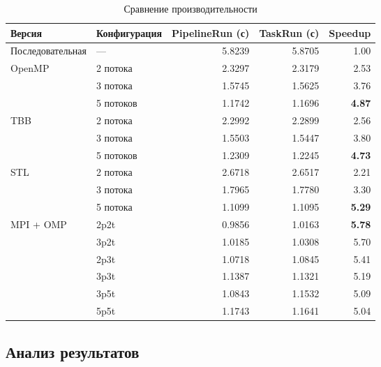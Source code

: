 \documentclass[14pt,a4paper]{extarticle}
\begin{document}
\begin{table}[H]
\centering
\footnotesize
\renewcommand{\arraystretch}{1.2}
\setlength{\tabcolsep}{4pt}
\begin{tabularx}{0.95\textwidth}{@{}l>{\raggedright}Xrrr@{}}
\toprule
\textbf{Версия} & \textbf{Конфигурация} & \textbf{PipelineRun (с)} & \textbf{TaskRun (с)} & \textbf{Speedup} \\ 
\midrule
Последовательная & — & 5.8239 & 5.8705 & 1.00 \\
\midrule

OpenMP 
  & 2 потока & 2.3297 & 2.3179 & 2.53 \\
  & 3 потока & 1.5745 & 1.5625 & 3.76 \\
  & 5 потоков & 1.1742 & 1.1696 & \textbf{4.87} \\
\midrule

TBB 
  & 2 потока & 2.2992 & 2.2899 & 2.56 \\
  & 3 потока & 1.5503 & 1.5447 & 3.80 \\
  & 5 потоков & 1.2309 & 1.2245 & \textbf{4.73} \\
\midrule

STL
  & 2 потока & 2.6718 & 2.6517 & 2.21 \\
  & 3 потока & 1.7965 & 1.7780 & 3.30 \\
  & 5 потока & 1.1099 & 1.1095 & \textbf{5.29} \\
\midrule

MPI + OMP 
  & 2p2t & 0.9856 & 1.0163 & \textbf{5.78} \\
  & 3p2t & 1.0185 & 1.0308 & 5.70 \\
  & 2p3t & 1.0718 & 1.0845 & 5.41 \\
  & 3p3t & 1.1387 & 1.1321 & 5.19 \\
  & 3p5t & 1.0843 & 1.1532 & 5.09 \\
  & 5p5t & 1.1743 & 1.1641 & 5.04 \\
\bottomrule
\end{tabularx}
\caption{Сравнение производительности}
\label{table:benchmark}
\end{table}


\subsection{Анализ результатов}
\end{document}

